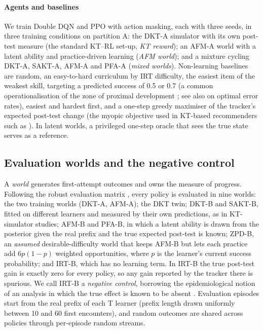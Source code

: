 \paragraph{Agents and baselines} We train Double DQN \citep{mnih2015dqn,vanhasselt2016ddqn} and PPO \citep{schulman2017ppo} with action masking, each with three seeds, in three training conditions on partition A: the DKT-A simulator with its own post-test measure (the standard KT--RL set-up, \emph{KT reward}); an AFM-A world with a latent ability and practice-driven learning (\emph{AFM world}); and a mixture cycling DKT-A, SAKT-A, AFM-A and PFA-A (\emph{mixed worlds}). Non-learning baselines are random, an easy-to-hard curriculum by IRT difficulty, the easiest item of the weakest skill, targeting a predicted success of 0.5 or 0.7 (a common operationalisation of the zone of proximal development \citep{vygotsky1978mind}; see also \citealp{wilson2019eighty} on optimal error rates), easiest and hardest first, and a one-step greedy maximiser of the tracker's expected post-test change (the myopic objective used in KT-based recommenders such as \citet{ozyurt2025exrec}). In latent worlds, a privileged one-step oracle that sees the true state serves as a reference.

\subsection{Evaluation worlds and the negative control}\label{sec:worlds}

A \emph{world} generates first-attempt outcomes and owns the measure of progress. Following the robust evaluation matrix \citep{doroudi2017rem}, every policy is evaluated in nine worlds: the two training worlds (DKT-A, AFM-A); the DKT twin; DKT-B and SAKT-B, fitted on different learners and measured by their own predictions, as in KT-simulator studies; AFM-B and PFA-B, in which a latent ability is drawn from the posterior given the real prefix and the true expected post-test is known; ZPD-B, an \emph{assumed} desirable-difficulty world that keeps AFM-B but lets each practice add $6p(1-p)$ weighted opportunities, where $p$ is the learner's current success probability; and IRT-B, which has no learning term. In IRT-B the true post-test gain is exactly zero for every policy, so any gain reported by the tracker there is spurious. We call IRT-B a \emph{negative control}, borrowing the epidemiological notion of an analysis in which the true effect is known to be absent \citep{lipsitch2010negative,arnold2016negative}. Evaluation episodes start from the real prefix of each T learner (prefix length drawn uniformly between 10 and 60 first encounters), and random outcomes are shared across policies through per-episode random streams.

